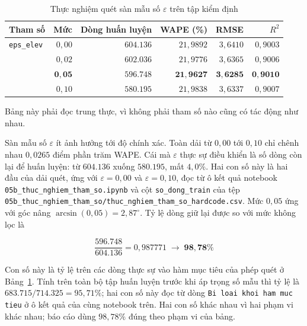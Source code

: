 \documentclass[12pt, a4paper]{report}
\begin{document}
\begin{table}[htbp]
\centering
\caption{Thực nghiệm quét sàn mẫu số $\varepsilon$ trên tập kiểm định}
\label{tab:quet_tham_so}
\small
\begin{tabular}{l r r r r r}
\toprule
\textbf{Tham số} & \textbf{Mức} & \textbf{Dòng huấn luyện} & \textbf{WAPE (\%)} & \textbf{RMSE} & \textbf{$R^2$} \\
\midrule
\texttt{eps\_elev}
 & $0{,}00$ & $604.136$ & $21{,}9892$ & $3{,}6410$ & $0{,}9003$ \\
 & $0{,}02$ & $602.036$ & $21{,}9776$ & $3{,}6365$ & $0{,}9006$ \\
 & $\mathbf{0{,}05}$ & $\mathbf{596.748}$ & $\mathbf{21{,}9627}$ & $\mathbf{3{,}6285}$ & $\mathbf{0{,}9010}$ \\
 & $0{,}10$ & $580.195$ & $21{,}9838$ & $3{,}6337$ & $0{,}9007$ \\
\bottomrule
\end{tabular}


\end{table}

Bảng này phải đọc trung thực, vì không phải tham số nào cũng có tác động như nhau.

Sàn mẫu số $\varepsilon$ ít ảnh hưởng tới độ chính xác. Toàn dải từ $0{,}00$ tới
$0{,}10$ chỉ chênh nhau $0{,}0265$ điểm phần trăm WAPE. Cái mà $\varepsilon$ thực sự điều
khiển là số dòng còn lại để huấn luyện: từ $604.136$ xuống $580.195$, mất $4{,}0\%$. Hai
con số này là hai đầu của dải quét, ứng với $\varepsilon = 0{,}00$ và $\varepsilon = 0{,}10$,
đọc từ ô kết quả notebook \texttt{05b\_thuc\_nghiem\allowbreak \_tham\_so.ipynb} và cột
\texttt{so\_dong\_train} của tệp \texttt{05b\_thuc\_nghiem\_tham\_so/\allowbreak thuc\_nghiem\_tham\_so\_hardcode.csv}.
Mức $0{,}05$ ứng với góc nâng $\arcsin(0{,}05) = 2{,}87^\circ$. Tỷ lệ dòng giữ lại được so với mức
không lọc là

\begin{equation}
\frac{596.748}{604.136} = 0{,}987771 \;\longrightarrow\; \mathbf{98{,}78\%}
\end{equation}

Con số này là tỷ lệ trên các dòng thực sự vào hàm mục tiêu của phép quét ở
Bảng~\ref{tab:quet_tham_so}. Tính trên toàn bộ tập huấn luyện trước khi áp trọng số mẫu thì
tỷ lệ là $683.715 / 714.325 = 95{,}71\%$; hai con số này đọc từ dòng
\texttt{Bi loai khoi ham muc tieu} ở ô kết quả của cùng notebook trên. Hai con số khác nhau vì hai phạm vi khác nhau; báo
cáo dùng $98{,}78\%$ đúng theo phạm vi của bảng.
\end{document}
